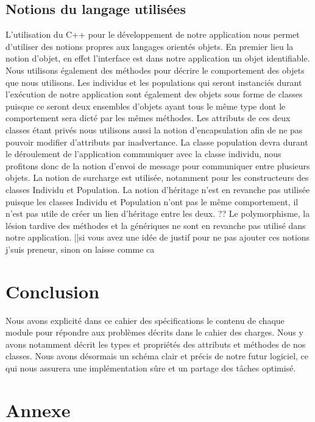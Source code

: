 \documentclass[a4paper,11pt]{article}
\begin{document}
		\subsection{Notions du langage utilisées}
			L’utilisation du C++ pour le développement de notre application nous permet d’utiliser des notions propres aux langages orientés objets.
			En premier lieu la notion d’objet, en effet l’interface est dans notre application un objet identifiable.
			Nous utilisons également des méthodes pour décrire le comportement des objets que nous utilisons.
			Les individus et les populations qui seront instanciés durant l'exécution de notre application sont également des objets sous forme de classes puisque ce seront deux ensembles d’objets ayant tous le même type dont le comportement sera dicté par les mêmes méthodes.
			Les attributs de ces deux classes étant privés nous utilisons aussi la notion d’encapsulation afin de ne pas pouvoir modifier d’attributs par inadvertance.
			La classe population devra durant le déroulement de l’application communiquer avec la classe individu, nous profitons donc de la notion d’envoi de message pour communiquer entre plusieurs objets.
			La notion de surcharge est utilisée, notamment pour les constructeurs des classes Individu et Population.
			La notion d’héritage n’est en revanche pas utilisée puisque les classes Individu et Population n’ont pas le même comportement, il n’est pas utile de créer un lien d’héritage entre les deux.
			?? Le polymorphisme, la lésion tardive des méthodes et la génériques ne sont en revanche pas utilisé dans notre application. ||si vous avez une idée de justif pour ne pas ajouter ces notions 
			j'suis preneur, sinon on laisse comme ca\\


	\section{Conclusion}	
		Nous avons explicité dans ce cahier des spécifications le contenu de chaque module pour répondre aux problèmes décrits dans le cahier des charges.
		Nous y avons notamment décrit les types et propriétés des attributs et méthodes de nos classes.
		Nous avons désormais un schéma clair et précis de notre futur logiciel, ce qui nous assurera une implémentation sûre et un partage des tâches optimisé.
		
	\newpage
	\section{Annexe}
\end{document}
